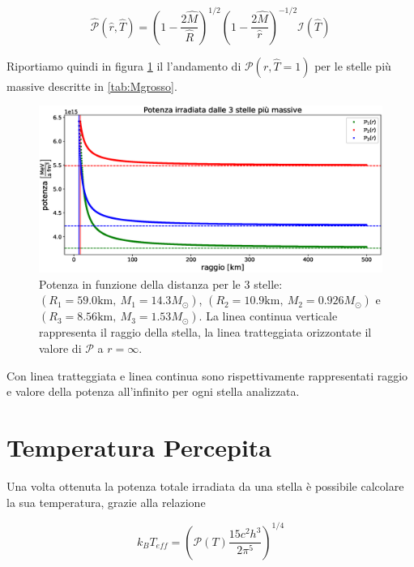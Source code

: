 \documentclass[a4paper, titlepage]{article}
\begin{document}
\begin{equation}
    \mathcal{\hat P} (\hat r, \hat T) = \left(1 - \frac{2 \hat M}{\hat R} \right)^{1/2} \left(1 - \frac{2 \hat M}{\hat r} \right)^{-1/2} \mathcal I (\hat T)
    \label{eq:Pot_I}
\end{equation}

Riportiamo quindi in figura \ref{fig:Pot} il l'andamento di $\mathcal P (r, \hat T = 1)$ per le stelle più massive descritte in \ref{tab:Mgrosso}.

\begin{figure}[h]
    \centering
    \includegraphics[width = \textwidth]{Figures/Pot.eps}
    \caption{Potenza in funzione della distanza per le 3 stelle: $(R_1 = 59.0 \unit{\kilo\meter},~M_1 = 14.3 M_\odot)$, $(R_2 = 10.9 \unit{\kilo\meter},~M_2 = 0.926 M_\odot)$ e $(R_3 = 8.56 \unit{\kilo\meter},~M_3 = 1.53 M_\odot)$.
    La linea continua verticale rappresenta il raggio della stella, la linea tratteggiata orizzontate il valore di $\mathcal{P}$ a $r = \infty$.}
    \label{fig:Pot}
\end{figure}

Con linea tratteggiata e linea continua sono rispettivamente rappresentati raggio e valore della potenza all'infinito per ogni stella analizzata.



\newpage


\section{Temperatura Percepita}
\label{sec:temp_perc}

Una volta ottenuta la potenza totale irradiata da una stella è possibile
calcolare la sua temperatura, grazie alla relazione

\begin{equation}
    k_B T_{eff} = \left( \mathcal P (T) \frac{15 c^2 h^3}{2 \pi^5} \right)^{1/4}
    \label{eq:Teff}
\end{equation}
\end{document}
